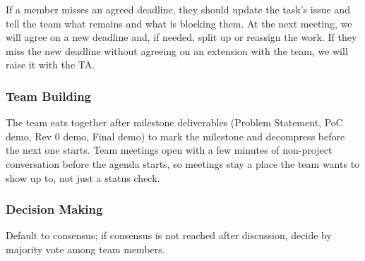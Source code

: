 \documentclass{article}
\begin{document}
If a member misses an agreed deadline, they should update the task's issue
and tell the team what remains and what is blocking them. At the next
meeting, we will agree on a new deadline and, if needed, split up or
reassign the work. If they miss the new deadline without agreeing on an
extension with the team, we will raise it with the TA.

\subsubsection*{Team Building}

The team eats together after milestone deliverables (Problem Statement,
PoC demo, Rev 0 demo, Final demo) to mark the milestone and decompress
before the next one starts. Team meetings open with a few minutes of
non-project conversation before the agenda starts, so meetings stay a
place the team wants to show up to, not just a status check.

\subsubsection*{Decision Making}

Default to consensus; if consensus is not reached after discussion, decide
by majority vote among team members.
\end{document}
